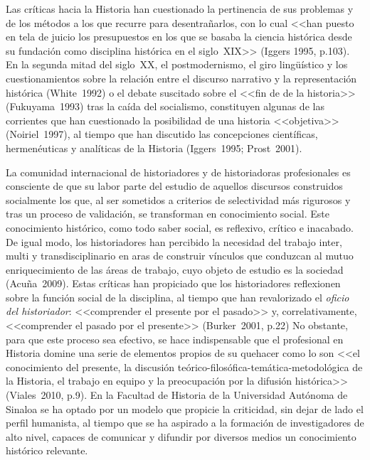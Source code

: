 \enlargethispage{1\baselineskip}
Las críticas hacia la Historia han cuestionado la pertinencia de sus
problemas y de los métodos a los que recurre para desentrañarlos, con lo
cual <<han puesto en tela de juicio los presupuestos en los que se basaba la
ciencia histórica desde su fundación como disciplina histórica en el siglo~XIX>> (Iggers 1995, p.103). En la segunda mitad del siglo~XX, el
postmodernismo, el giro lingüístico y los cuestionamientos sobre la
relación entre el discurso narrativo y la representación histórica (White~1992) 
o el debate suscitado sobre el <<fin de de la historia>> (Fukuyama~1993) 
tras la caída del socialismo, constituyen algunas de las corrientes
que han cuestionado la posibilidad de una historia <<objetiva>> (Noiriel~1997), al tiempo que han discutido las concepciones científicas,
hermenéuticas y analíticas de la Historia (Iggers~1995; Prost~2001).

La comunidad internacional de historiadores y de historiadoras profesionales
es consciente de que su labor parte del estudio de aquellos discursos
construidos socialmente los que, al ser sometidos a criterios de
selectividad más rigurosos y tras un proceso de validación, se transforman
en conocimiento social. Este conocimiento histórico, como todo saber social,
es reflexivo, crítico e inacabado. De igual modo, los historiadores han
percibido la necesidad del trabajo inter, multi y transdisciplinario en
aras de construir vínculos que conduzcan al mutuo enriquecimiento de las
áreas de trabajo, cuyo objeto de estudio es la sociedad (Acuña~2009). Estas
críticas han propiciado que los historiadores reflexionen sobre la función
social de la disciplina, al tiempo que han revalorizado el \textit{oficio del
historiador}: <<comprender el presente por el pasado>> y, correlativamente,
<<comprender el pasado por el presente>> (Burker~2001, p.22) No obstante,
para que este proceso sea efectivo, se hace indispensable que el
profesional en Historia domine una serie de elementos propios de su
quehacer como lo son <<el conocimiento del presente, la discusión
teórico-filosófica-temática-metodológica de la Historia, el trabajo en
equipo y la preocupación por la difusión histórica>>
(Viales~2010, p.9). En la Facultad de Historia de la Universidad Autónoma
de Sinaloa se ha optado por un modelo que propicie la criticidad, sin dejar
de lado el perfil humanista, al tiempo que se ha aspirado a la formación de
investigadores de alto nivel, capaces de comunicar y difundir por diversos
medios un conocimiento histórico relevante. 
 
